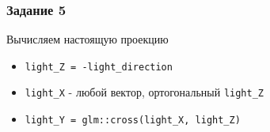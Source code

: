 \documentclass{beamer}
\begin{document}
\begin{frame}[fragile]
\frametitle{Задание 5}
\fontsize{10pt}{10pt}
Вычисляем настоящую проекцию
\begin{itemize}
\item \verb|light_Z = -light_direction|
\item \verb|light_X| - любой вектор, ортогональный \verb|light_Z|
\item \verb|light_Y = glm::cross(light_X, light_Z)|
\end{itemize}
\end{frame}
\end{document}
